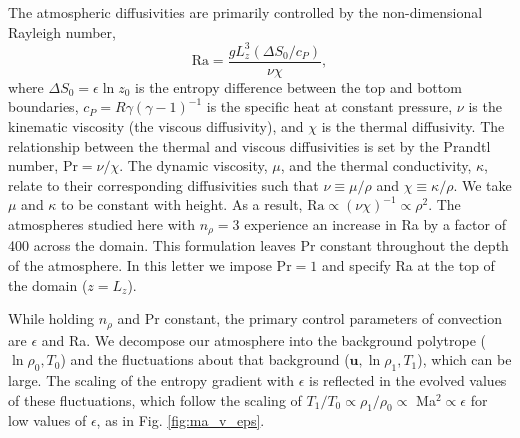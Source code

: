 \documentclass[aps, prl, twocolumn, nofootinbib, groupedaddress, amsfonts, amssymb, amsmath]{revtex4-1}
\begin{document}
The atmospheric diffusivities are primarily controlled by
the non-dimensional Rayleigh number,
\begin{equation}
\text{Ra} = \frac{g L_z^3 (\Delta S_0 / c_P)}{\nu\chi},
\end{equation}
where $\Delta S_0 = \epsilon\ln z_0$ is the entropy difference 
between the top and bottom boundaries, 
$c_P = R\gamma(\gamma-1)^{-1}$ is the specific heat 
at constant pressure, $\nu$ is the kinematic viscosity 
(the viscous diffusivity), and $\chi$ is the thermal diffusivity.  
The relationship between the thermal and viscous diffusivities is
set by the Prandtl number, $\text{Pr} = \nu/\chi$.   
The dynamic viscosity, $\mu$, and the thermal conductivity,
$\kappa$, relate to their corresponding diffusivities such that 
$\nu \equiv \mu/\rho$ and $\chi \equiv \kappa/\rho$.  We take
$\mu$ and $\kappa$ to be constant with height.
As a result, $\text{Ra} \propto (\nu\chi)^{-1} \propto
\rho^2$.  The atmospheres studied here with $n_{\rho} = 3$ 
experience an increase in Ra 
by a factor of 400 across the domain.  This formulation leaves Pr
constant throughout the depth of the atmosphere. 
In this letter we impose $\text{Pr} = 1$ and specify Ra at 
the top of the domain ($z = L_z$). 

While holding $n_\rho$ and Pr constant, 
the primary control parameters of convection are $\epsilon$
and Ra.  We decompose our atmosphere into the background 
polytrope ($\ln\rho_{0}, T_{0}$) and the fluctuations
about that background ($\bm{u}, \ln\rho_{1}, T_{1}$),
which can be large.
The scaling of the entropy gradient with $\epsilon$
is reflected in the evolved values of these fluctuations, 
which follow the scaling of
$T_1/T_0 \propto \rho_{1}/\rho_{0} \propto$ Ma$^{2} \propto \epsilon$ 
for low values of $\epsilon$,
as in Fig. \ref{fig:ma_v_eps}.  
\end{document}
